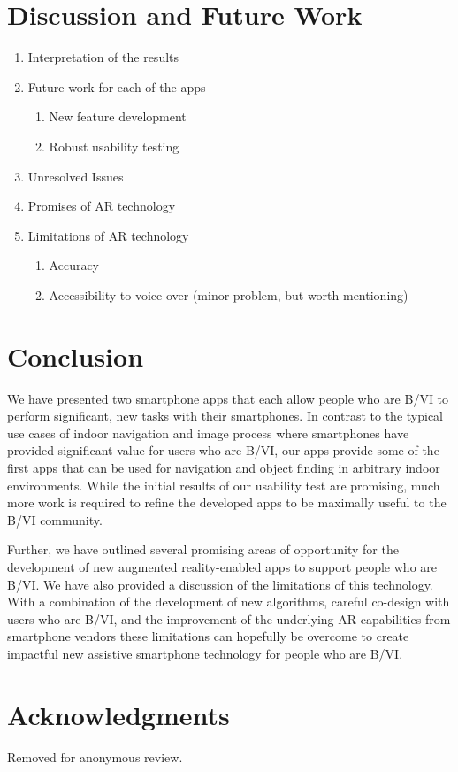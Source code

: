\documentclass[chi_draft]{sigchi}
\begin{document}
\section{Discussion and Future Work}
\begin{enumerate}
\item Interpretation of the results
\item Future work for each of the apps
\begin{enumerate}
\item New feature development
\item Robust usability testing
\end{enumerate}
\item Unresolved Issues
\item Promises of AR technology
\item Limitations of AR technology
\begin{enumerate}
\item Accuracy
\item Accessibility to voice over (minor problem, but worth mentioning)
\end{enumerate}
\end{enumerate}

\section{Conclusion}
We have presented two smartphone apps that each allow people who are B/VI to perform significant, new tasks with their smartphones.  In contrast to the typical use cases of indoor navigation and image process where smartphones have provided significant value for users who are B/VI, our apps provide some of the first apps that can be used for navigation and object finding in arbitrary indoor environments.  While the initial results of our usability test are promising, much more work is required to refine the developed apps to be maximally useful to the B/VI community.

Further, we have outlined several promising areas of opportunity for the development of new augmented reality-enabled apps to support people who are B/VI.  We have also provided a discussion of the limitations of this technology.  With a combination of the development of new algorithms, careful co-design with users who are B/VI, and the improvement of the underlying AR capabilities from smartphone vendors these limitations can hopefully be overcome to create impactful new assistive smartphone technology for people who are B/VI.  

\section{Acknowledgments}
Removed for anonymous review.

\balance{}

\newpage


\end{document}
